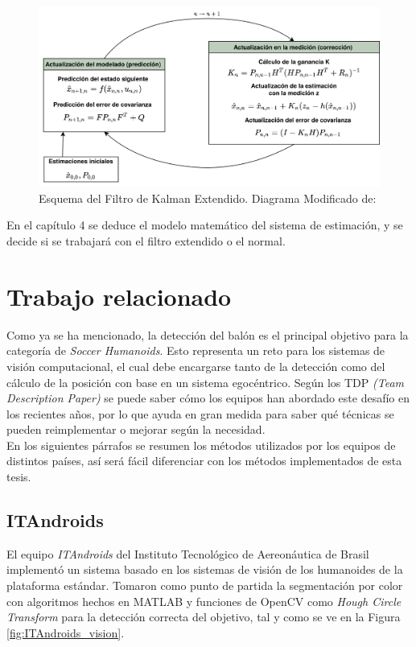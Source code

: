 \begin{figure}
\centering
\includegraphics[scale=0.05]{images/extended_kalman_algorithm.png}
\caption{Esquema del Filtro de Kalman Extendido. Diagrama Modificado de: \cite{welch1995introduction}}
\label{fig:extended_kalman_scheme}
\end{figure}

En el capítulo 4 se deduce el modelo matemático del sistema de estimación, y se decide si se trabajará con el filtro extendido o el normal. 
	\section{Trabajo relacionado}
	
	Como ya se ha mencionado, la detección del balón es el principal objetivo para la categoría de \textit{Soccer Humanoids}. Esto representa un reto para los sistemas de visión computacional, el cual debe encargarse tanto de la detección como del cálculo de la posición con base en un sistema egocéntrico. Según los TDP \textit{(Team Description Paper)} se puede saber cómo los equipos han abordado este desafío en los recientes años, por lo que ayuda en gran medida para saber qué técnicas se pueden reimplementar o mejorar según la necesidad. 
\\	

	En los siguientes párrafos se resumen los métodos utilizados por los equipos de distintos países, así será fácil diferenciar con los métodos implementados de esta tesis.
	
	\subsection*{ITAndroids}
	El equipo \textit{ITAndroids} del Instituto Tecnológico de Aereonáutica de Brasil implementó un sistema basado en los sistemas de visión de los humanoides de la plataforma estándar. Tomaron como punto de partida la segmentación por color con algoritmos hechos en MATLAB y funciones de OpenCV como \textit{Hough Circle Transform} para la detección correcta del objetivo, tal y como se ve en la Figura \ref{fig:ITAndroids_vision}.
	
